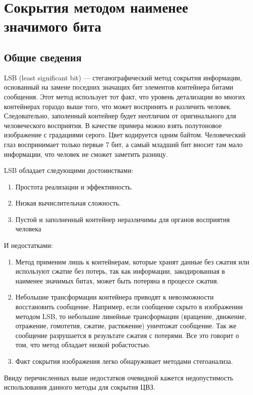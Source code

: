 \chapter{Сокрытия методом наименее значимого бита} %
\section{Общие сведения}
LSB (least significant bit) --- стеганографический метод сокрытия информации, основанный на замене поседних значащих бит
элементов контейнера битами сообщения. Этот метод использует тот факт,
что уровень детализации во многих контейнерах гораздо выше того,
что может воспринять и различить человек.
Следовательно, заполенный контейнер будет неотличим от оригинального
для человеческого восприятия. В качестве примера можно взять
полутоновое изображение с градациями серого. Цвет кодируется одним байтом.
Человеческий глаз воспринимает только первые 7 бит,
а самый младший бит вносит там мало информации, что человек не сможет заметить разницу.

LSB обладает следующими достоинствами:
\begin{enumerate}
    \item Простота реализации и эффективность.
    \item Низкая вычислительная сложность.
    \item Пустой и заполненный контейнер неразличимы для органов восприятия человека
\end{enumerate}
И недостатками:
\begin{enumerate}
    \item Метод применим лишь к контейнерам, которые хранят данные без сжатия или используют
    сжатие без потерь, так как информации, закодированная в наименее значимых битах, может
    быть потеряна в процессе сжатия.
    \item Небольшие трансформации контейнера приводят к невозможности восстановить сообщение.
    Например, если сообщение скрыто в изображении методом LSB, то небольшие линейные трансформации
    (вращение, движение, отражение, гомотетия, сжатие, растяжение) уничтожат сообщение. Так же
    сообщение разрушается в результате сжатия с потерями. Все это говорит о том, что метод обладает
    низкой робастостью.
    \item Факт сокрытия изображения легко обнаруживает методами стегоанализа.
\end{enumerate}

Ввиду перечисленных выше недостатков очевидной кажется недопустимость использования
данного методы для сокрытия ЦВЗ.

